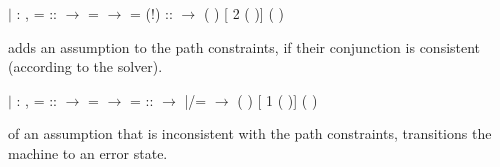 \documentclass[12pt]{report}
\begin{document}
           
\begin{coqdoccode}
\coqdocindent{3.00em}
\ensuremath{|}  : \coqdockw{\ensuremath{\forall}}           ,\coqdoceol
\coqdocindent{5.00em}
 =    ::  \ensuremath{\rightarrow}\coqdoceol
\coqdocindent{5.00em}
   =   \ensuremath{\rightarrow}\coqdoceol
\coqdocindent{5.00em}
 = (!) ::  \ensuremath{\rightarrow}\coqdoceol
\coqdocindent{5.00em}
 \coqdoceol
\coqdocindent{6.00em}
(        ) [ 2 (  )]\coqdoceol
\coqdocindent{6.00em}
(      )\coqdoceol
\coqdocnoindent
\coqdoceol
\coqdocnoindent
\coqdoceol
\coqdocnoindent
\coqdoceol
\coqdocindent{3.00em}
\coqdoceol
\coqdocindent{3.00em}
\coqdoceol
\coqdocnoindent
\coqdoceol
\coqdocnoindent
\coqdoceol
\coqdocindent{3.00em}
\end{coqdoccode}
 adds an assumption to the path constraints,
          if their conjunction is consistent (according to
          the solver).


           
\begin{coqdoccode}
\coqdocindent{3.00em}
\ensuremath{|}  : \coqdockw{\ensuremath{\forall}}          ,\coqdoceol
\coqdocindent{5.00em}
 =   ::  \ensuremath{\rightarrow}\coqdoceol
\coqdocindent{5.00em}
   =   \ensuremath{\rightarrow}\coqdoceol
\coqdocindent{5.00em}
 =  ::  \ensuremath{\rightarrow}\coqdoceol
\coqdocindent{5.00em}
 |/=  \ensuremath{\rightarrow}\coqdoceol
\coqdocindent{5.00em}
 \coqdoceol
\coqdocindent{6.00em}
(        ) [ 1 ( )]\coqdoceol
\coqdocindent{6.00em}
(      )\coqdoceol
\coqdocnoindent
\coqdoceol
\coqdocindent{3.00em}
\end{coqdoccode}
 of an assumption that is inconsistent with
          the path constraints, transitions the machine
          to an error state.
\end{document}
